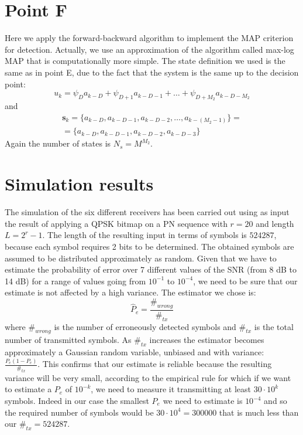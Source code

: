 \documentclass[a4paper,11.5pt]{article}
\newcommand{\vt}{\boldsymbol}
\begin{document}
\section*{Point F}

Here we apply the forward-backward algorithm to implement the MAP criterion for detection. Actually, we use an approximation of the algorithm called max-log MAP that is computationally more simple. The state definition we used is the same as in point E, due to the fact that the system is the same up to the decision point:
\begin{equation}
u_k=\psi_D a_{k-D} + \psi_{D+1} a_{k-D-1} + \dots +\psi_{D+M_2} a_{k-D-M_2}
\end{equation}
and
\begin{equation}
\begin{split}
\vt{s}_k = \{a_{k-D}, a_{k-D-1}, a_{k-D-2}, \dots, a_{k-(M_2-1)}\} = \\
= \{a_{k-D}, a_{k-D-1}, a_{k-D-2}, a_{k-D-3}\}
\end{split}
\end{equation}
Again the number of states is $N_s=M^{M_2}$.




\section*{Simulation results}

The simulation of the six different receivers has been carried out using as input the result of applying a QPSK bitmap on a PN sequence with $r=20$ and length $L=2^r-1$. The length of the resulting input in terms of symbols is $524287$, because each symbol requires 2 bits to be determined. The obtained symbols are assumed to be distributed approximately as random. Given that we have to estimate the probability of error over 7 different values of the SNR (from 8 dB to 14 dB) for a range of values going from $10^{-1}$ to $10^{-4}$, we need to be sure that our estimate is not affected by a high variance. The estimator we chose is:
\begin{equation}
\hat{P}_e = \frac{\#_{wrong}}{\#_{tx}}
\end{equation}
where $\#_{wrong}$ is the number of erroneously detected symbols and $\#_{tx}$ is the total number of transmitted symbols. As $\#_{tx}$ increases the estimator becomes approximately a Gaussian random variable, unbiased and with variance: $\frac{P_e (1-P_e)}{\#_{tx}}$. This confirms that our estimate is reliable because the resulting variance will be very small, according to the empirical rule for which if we want to estimate a $P_e$ of $10^{-k}$, we need to measure it transmitting at least $30\cdot 10^{k}$ symbols. Indeed in our case the smallest $P_e$ we need to estimate is $10^{-4}$ and so the required number of symbols would be $30\cdot 10^{4}= 300000$ that is much less than our $\#_{tx}=524287$.
\end{document}
